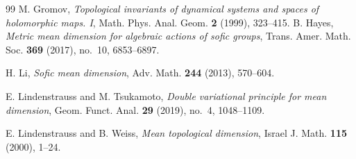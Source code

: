 \documentclass[12pt]{amsart}
\theoremstyle{definition}
\theoremstyle{remark}
\begin{document}
\enlargethispage{4\baselineskip}
\small
\begin{thebibliography}{99}
M. Gromov, \textit{Topological invariants of dynamical systems and spaces of holomorphic maps. I}, Math. Phys. Anal. Geom. \textbf{2} (1999), 323–415.
B. Hayes,
\emph{Metric mean dimension for algebraic actions of sofic groups},
Trans. Amer. Math. Soc. \textbf{369} (2017), no.~10, 6853--6897.

H. Li,
\emph{Sofic mean dimension},
Adv. Math. \textbf{244} (2013), 570--604.

E. Lindenstrauss and M. Tsukamoto,
\emph{Double variational principle for mean dimension},
Geom. Funct. Anal. \textbf{29} (2019), no.~4, 1048--1109.

E. Lindenstrauss and B. Weiss,
\emph{Mean topological dimension},
Israel J. Math. \textbf{115} (2000), 1--24.

\end{thebibliography}
\end{document}
